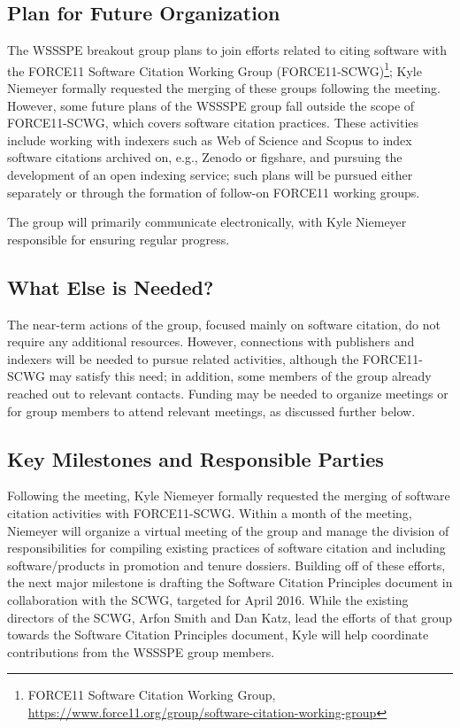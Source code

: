 \subsection{Plan for Future Organization}
\label{SC:plan}

The WSSSPE breakout group plans to join efforts related to citing software with
the FORCE11 Software Citation Working Group (FORCE11-SCWG)\footnote{FORCE11
Software Citation Working Group,
\url{https://www.force11.org/group/software-citation-working-group}}; Kyle
Niemeyer formally requested the merging of these groups following the meeting.
However, some future plans of the WSSSPE group fall outside the scope of
FORCE11-SCWG, which covers software citation practices. These activities include
working with indexers such as Web of Science and Scopus to index software
citations archived on, e.g., Zenodo or figshare, and pursuing the development of
an open indexing service; such plans will be pursued either separately or
through the formation of follow-on FORCE11 working groups.

The group will primarily communicate electronically, with Kyle Niemeyer
responsible for ensuring regular progress.

\subsection{What Else is Needed?}

The near-term actions of the group, focused mainly on software citation, do not
require any additional resources. However, connections with publishers and
indexers will be needed to pursue related activities, although the FORCE11-SCWG
may satisfy this need; in addition, some members of the group already reached
out to relevant contacts. Funding may be needed to organize meetings or for
group members to attend relevant meetings, as discussed further below.

\subsection{Key Milestones and Responsible Parties}

Following the meeting, Kyle Niemeyer formally requested the merging of software
citation activities with FORCE11-SCWG. Within a month of the meeting, Niemeyer will
organize a virtual meeting of the group and manage the division of
responsibilities for compiling existing practices of software citation and
including software\slash products in promotion and tenure dossiers. Building off
of these efforts, the next major milestone is drafting the Software Citation
Principles document in collaboration with the SCWG, targeted for April 2016.
While the existing directors of the SCWG, Arfon Smith and Dan Katz, lead the
efforts of that group towards the Software Citation Principles document, Kyle
will help coordinate contributions from the WSSSPE group members.


